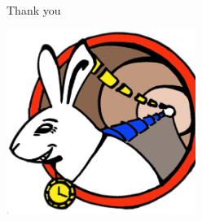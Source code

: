 \documentclass[compress,red]{beamer}
\begin{document}
\subsection{}
\begin{frame}{Thank you}


    
    \begin{center}
    \includegraphics[height=6.0cm]{logo/WRlogo.ps}
    \end{center}

\end{frame}
\end{document}
